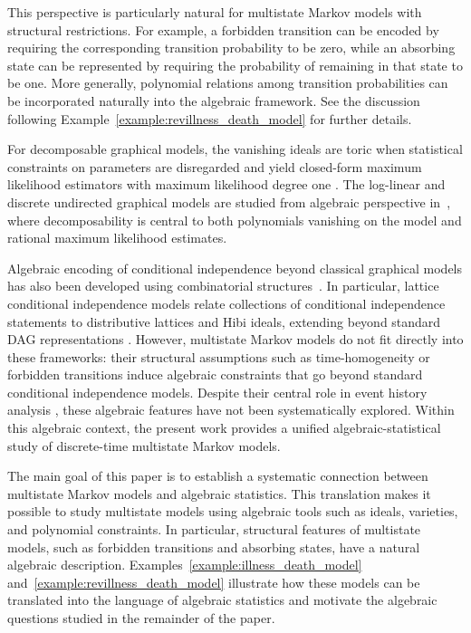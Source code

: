 \documentclass[11pt, a4paper]{article}
\numberwithin{equation}{section}
\theoremstyle{plain}
\theoremstyle{definition}
\begin{document}
This perspective is particularly natural for multistate Markov models with structural restrictions. For example, a forbidden transition can be encoded by requiring the corresponding transition probability to be zero, while an absorbing state can be represented by requiring the probability of remaining in that state to be one. More generally, polynomial relations among transition probabilities can be incorporated naturally into the algebraic framework. See the discussion following Example~\ref{example:revillness_death_model} for further details. 


For decomposable graphical
models, the vanishing ideals are toric when statistical constraints on parameters are disregarded and yield closed-form maximum likelihood estimators with
maximum likelihood degree one \cite{diaconis1998algebraic,dobra2003markov}. The log-linear and discrete undirected graphical models are studied from algebraic perspective in~\cite{geiger2006toric}, where decomposability is central to both polynomials vanishing on the model and rational maximum likelihood estimates.


Algebraic encoding of conditional independence beyond classical graphical models has also been
developed using combinatorial structures~\cite{herzog2010binomial}. In particular, lattice conditional independence
models relate collections of conditional independence statements to distributive lattices and Hibi
ideals, extending beyond standard DAG representations
\cite{caines2022lattice,ene2011monomial}. 
However, multistate Markov models do not fit directly into these frameworks: their structural assumptions such as time-homogeneity or forbidden transitions induce algebraic constraints that go beyond standard conditional independence models. Despite their central role in event history analysis \cite{andersen2012multi}, these algebraic features have not been systematically explored.
Within this algebraic context, the present work provides a unified algebraic-statistical study of discrete-time multistate Markov models. 


The main goal of this paper is to establish a systematic connection between multistate Markov models and algebraic statistics. This translation makes it possible to study multistate models using algebraic tools such as ideals, varieties, and polynomial constraints. In particular, structural features of multistate models, such as forbidden transitions and absorbing states, have a natural algebraic description. Examples~\ref{example:illness_death_model} and~\ref{example:revillness_death_model} illustrate how these models can be translated into the language of algebraic statistics and motivate the algebraic questions studied in the remainder of the paper.
\end{document}
